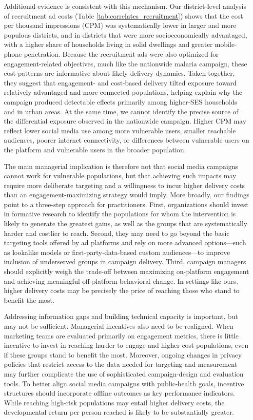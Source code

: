 Additional evidence is consistent with this mechanism. Our district-level analysis of recruitment ad costs (Table \ref{tab:correlates_recruitment}) shows that the cost per thousand impressions (CPM) was systematically lower in larger and more populous districts, and in districts that were more socioeconomically advantaged, with a higher share of households living in solid dwellings and greater mobile-phone penetration. Because the recruitment ads were also optimized for engagement-related objectives, much like the nationwide malaria campaign, these cost patterns are informative about likely delivery dynamics. Taken together, they suggest that engagement- and cost-based delivery tilted exposure toward relatively advantaged and more connected populations, helping explain why the campaign produced detectable effects primarily among higher-SES households and in urban areas. At the same time, we cannot identify the precise source of the differential exposure observed in the nationwide campaign. Higher CPM may reflect lower social media use among more vulnerable users, smaller reachable audiences, poorer internet connectivity, or differences between vulnerable users on the platform and vulnerable users in the broader population.

The main managerial implication is therefore not that social media campaigns cannot work for vulnerable populations, but that achieving such impacts may require more deliberate targeting and a willingness to incur higher delivery costs than an engagement-maximizing strategy would imply. More broadly, our findings point to a three-step approach for practitioners. First, organizations should invest in formative research to identify the populations for whom the intervention is likely to generate the greatest gains, as well as the groups that are systematically harder and costlier to reach. Second, they may need to go beyond the basic targeting tools offered by ad platforms and rely on more advanced options---such as lookalike models or first-party-data-based custom audiences---to improve inclusion of underserved groups in campaign delivery. Third, campaign managers should explicitly weigh the trade-off between maximizing on-platform engagement and achieving meaningful off-platform behavioral change. In settings like ours, higher delivery costs may be precisely the price of reaching those who stand to benefit the most.

Addressing information gaps and building technical capacity is important, but may not be sufficient. Managerial incentives also need to be realigned. When marketing teams are evaluated primarily on engagement metrics, there is little incentive to invest in reaching harder-to-engage and higher-cost populations, even if these groups stand to benefit the most. Moreover, ongoing changes in privacy policies that restrict access to the data needed for targeting and measurement may further complicate the use of sophisticated campaign-design and evaluation tools. To better align social media campaigns with public-health goals, incentive structures should incorporate offline outcomes as key performance indicators. While reaching high-risk populations may entail higher delivery costs, the developmental return per person reached is likely to be substantially greater.

